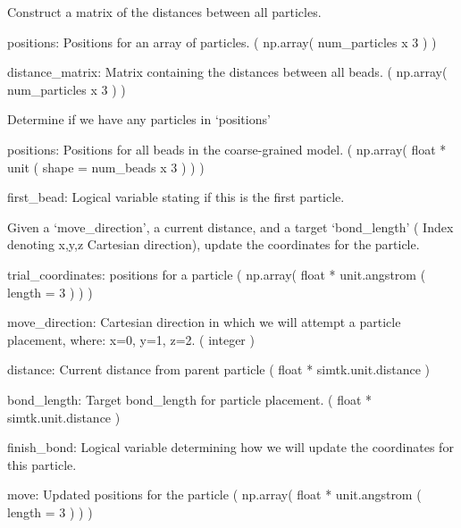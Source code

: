 \documentclass[letterpaper,10pt,english]{sphinxmanual}
\begin{document}

\begin{fulllineitems}
\label{\detokenize{index:utilities.util.distance_matrix}}
Construct a matrix of the distances between all particles.

positions: Positions for an array of particles.
( np.array( num\_particles x 3 ) )

distance\_matrix: Matrix containing the distances between all beads.
( np.array( num\_particles x 3 ) )

\end{fulllineitems}


\begin{fulllineitems}
\label{\detokenize{index:utilities.util.first_bead}}
Determine if we have any particles in ‘positions’

positions: Positions for all beads in the coarse-grained model.
( np.array( float * unit ( shape = num\_beads x 3 ) ) )

first\_bead: Logical variable stating if this is the first particle.

\end{fulllineitems}


\begin{fulllineitems}
\label{\detokenize{index:utilities.util.get_move}}
Given a ‘move\_direction’, a current distance, and a
target ‘bond\_length’ ( Index denoting x,y,z Cartesian 
direction), update the coordinates for the particle.

trial\_coordinates: positions for a particle
( np.array( float * unit.angstrom ( length = 3 ) ) )

move\_direction: Cartesian direction in which we will
attempt a particle placement, where: x=0, y=1, z=2. 
( integer )

distance: Current distance from parent particle
( float * simtk.unit.distance )

bond\_length: Target bond\_length for particle placement.
( float * simtk.unit.distance )

finish\_bond: Logical variable determining how we will
update the coordinates for this particle.

move: Updated positions for the particle
( np.array( float * unit.angstrom ( length = 3 ) ) )

\end{fulllineitems}
\end{document}

